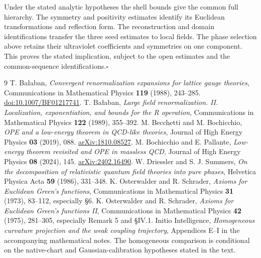 \documentclass[11pt,letterpaper]{article}
\begin{document}
Under the stated analytic hypotheses the shell bounds give the common
full hierarchy. The symmetry and positivity estimates identify its
Euclidean transformations and reflection form. The reconstruction and
domain identifications transfer the three seed estimates to local fields.
The phase selection above retains their ultraviolet coefficients and
symmetries on one component. This proves the stated implication, subject to the open estimates and the common-sequence identifications.\hfill\(\square\)

\begingroup\small
\begin{thebibliography}{9}
\setlength{\itemsep}{2pt}
 T. Ba\l aban, \emph{Convergent renormalization expansions for lattice gauge theories}, Communications in Mathematical Physics \textbf{119} (1988), 243--285. \href{https://doi.org/10.1007/BF01217741}{doi:10.1007/BF01217741}.
 T. Ba\l aban, \emph{Large field renormalization. II. Localization, exponentiation, and bounds for the R operation}, Communications in Mathematical Physics \textbf{122} (1989), 355--392.
 M. Becchetti and M. Bochicchio, \emph{OPE and a low-energy theorem in QCD-like theories}, Journal of High Energy Physics \textbf{03} (2019), 088. \href{https://arxiv.org/abs/1810.08527}{arXiv:1810.08527}.
 M. Bochicchio and E. Pallante, \emph{Low-energy theorem revisited and OPE in massless QCD}, Journal of High Energy Physics \textbf{08} (2024), 145. \href{https://arxiv.org/abs/2402.16490}{arXiv:2402.16490}.
 W. Driessler and S. J. Summers, \emph{On the decomposition of relativistic quantum field theories into pure phases}, Helvetica Physica Acta \textbf{59} (1986), 331--348.
 K. Osterwalder and R. Schrader, \emph{Axioms for Euclidean Green's functions}, Communications in Mathematical Physics \textbf{31} (1973), 83--112, especially \S6.
 K. Osterwalder and R. Schrader, \emph{Axioms for Euclidean Green's functions II}, Communications in Mathematical Physics \textbf{42} (1975), 281--305, especially Remark 5 and \S IV.1.
 Initio Intelligence, \emph{Homogeneous curvature projection and the weak coupling trajectory}, Appendices E--I in the accompanying mathematical notes. The homogeneous comparison is conditional on the native-chart and Gaussian-calibration hypotheses stated in the text.
\end{thebibliography}
\endgroup
\end{document}
